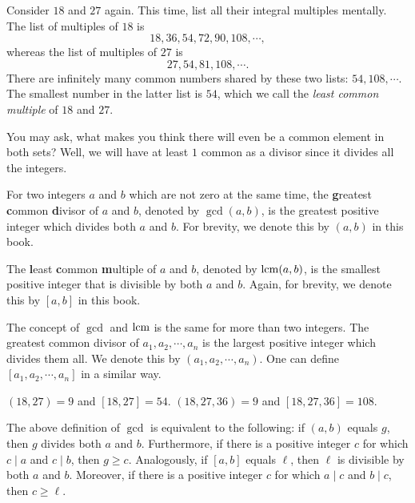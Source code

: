 \documentclass{subfile}
\begin{document}
	Consider $18$ and $27$ again. This time, list all their integral multiples mentally. The list of multiples of $18$ is $$18,36,54,72,90,108, \cdots,$$ whereas the list of multiples of $27$ is $$27,54,81,108, \cdots.$$ There are infinitely many common numbers shared by these two lists: $54, 108,\cdots$. The smallest number in the latter list is $54$, which we call the {\it least common multiple} of $18$ and $27$.

	You may ask, what makes you think there will even be a common element in both sets? Well, we will have at least $1$ common as a divisor since it divides all the integers.
	\begin{definition}
		For two integers $a$ and $b$ which are not zero at the same time, the \textbf{g}reatest \textbf{c}ommon \textbf{d}ivisor of $a$ and $b$, denoted by $\gcd(a,b)$, is the greatest positive integer which divides both $a$ and $b$. For brevity, we denote this by $(a,b)$ in this book.

		The \textbf{l}east \textbf{c}ommon \textbf{m}ultiple of $a$ and $b$, denoted by $\operatorname{lcm}(a,b)$, is the smallest positive integer that is divisible by both $a$ and $b$. Again, for brevity, we denote this by $[a,b]$ in this book.
	\end{definition}

	The concept of $\gcd$ and $\operatorname{lcm}$ is the same for more than two integers. The greatest common divisor of $a_1,a_2,\cdots,a_n$ is the largest positive integer which divides them all. We denote this by $(a_1,a_2,\cdots,a_n)$. One can define $[a_1,a_2,\cdots,a_n]$ in a similar way.

	\begin{example}
		$(18,27)=9$ and $[18,27]=54$. $(18,27,36)=9$ and $[18,27,36]=108$.
	\end{example}

	\begin{note}
		The above definition of $\gcd$ is equivalent to the following: if $(a, b)$ equals $g$, then $g$ divides both $a$ and $b$. Furthermore, if there is a positive integer $c$ for which $c\mid a$ and $c\mid b$, then $g \geq c$. Analogously, if $[a, b]$ equals $\ell$, then $\ell$ is divisible by both $a$ and $b$. Moreover, if there is a positive integer $c$ for which $a\mid c$ and $b\mid c$, then $c \geq \ell$.
	\end{note}
\end{document}
